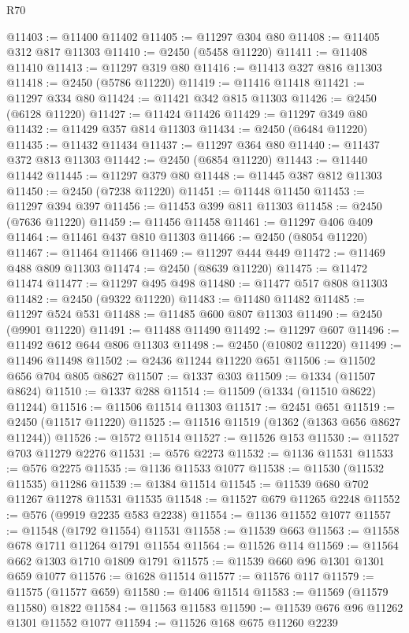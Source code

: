 \begin{lexlean}{R70}
\begin{coremodule}
@11403 := @11400 @11402
@11405 := @11297 @304 @80
@11408 := @11405 @312 @817 @11303
@11410 := @2450 (@5458 @11220)
@11411 := @11408 @11410
@11413 := @11297 @319 @80
@11416 := @11413 @327 @816 @11303
@11418 := @2450 (@5786 @11220)
@11419 := @11416 @11418
@11421 := @11297 @334 @80
@11424 := @11421 @342 @815 @11303
@11426 := @2450 (@6128 @11220)
@11427 := @11424 @11426
@11429 := @11297 @349 @80
@11432 := @11429 @357 @814 @11303
@11434 := @2450 (@6484 @11220)
@11435 := @11432 @11434
@11437 := @11297 @364 @80
@11440 := @11437 @372 @813 @11303
@11442 := @2450 (@6854 @11220)
@11443 := @11440 @11442
@11445 := @11297 @379 @80
@11448 := @11445 @387 @812 @11303
@11450 := @2450 (@7238 @11220)
@11451 := @11448 @11450
@11453 := @11297 @394 @397
@11456 := @11453 @399 @811 @11303
@11458 := @2450 (@7636 @11220)
@11459 := @11456 @11458
@11461 := @11297 @406 @409
@11464 := @11461 @437 @810 @11303
@11466 := @2450 (@8054 @11220)
@11467 := @11464 @11466
@11469 := @11297 @444 @449
@11472 := @11469 @488 @809 @11303
@11474 := @2450 (@8639 @11220)
@11475 := @11472 @11474
@11477 := @11297 @495 @498
@11480 := @11477 @517 @808 @11303
@11482 := @2450 (@9322 @11220)
@11483 := @11480 @11482
@11485 := @11297 @524 @531
@11488 := @11485 @600 @807 @11303
@11490 := @2450 (@9901 @11220)
@11491 := @11488 @11490
@11492 := @11297 @607
@11496 := @11492 @612 @644 @806 @11303
@11498 := @2450 (@10802 @11220)
@11499 := @11496 @11498
@11502 := @2436 @11244 @11220 @651
@11506 := @11502 @656 @704 @805 @8627
@11507 := @1337 @303
@11509 := @1334 (@11507 @8624)
@11510 := @1337 @288
@11514 := @11509 (@1334 (@11510 @8622) @11244)
@11516 := @11506 @11514 @11303
@11517 := @2451 @651
@11519 := @2450 (@11517 @11220)
@11525 := @11516 @11519 (@1362 (@1363 @656 @8627 @11244))
@11526 := @1572 @11514
@11527 := @11526 @153
@11530 := @11527 @703 @11279 @2276
@11531 := @576 @2273
@11532 := @1136 @11531
@11533 := @576 @2275
@11535 := @1136 @11533 @1077
@11538 := @11530 (@11532 @11535) @11286
@11539 := @1384 @11514
@11545 := @11539 @680 @702 @11267 @11278 @11531 @11535
@11548 := @11527 @679 @11265 @2248
@11552 := @576 (@9919 @2235 @583 @2238)
@11554 := @1136 @11552 @1077
@11557 := @11548 (@1792 @11554) @11531
@11558 := @11539 @663
@11563 := @11558 @678 @1711 @11264 @1791 @11554
@11564 := @11526 @114
@11569 := @11564 @662 @1303 @1710 @1809 @1791
@11575 := @11539 @660 @96 @1301 @1301 @659 @1077
@11576 := @1628 @11514
@11577 := @11576 @117
@11579 := @11575 (@11577 @659)
@11580 := @1406 @11514
@11583 := @11569 (@11579 @11580) @1822
@11584 := @11563 @11583
@11590 := @11539 @676 @96 @11262 @1301 @11552 @1077
@11594 := @11526 @168 @675 @11260 @2239

\end{coremodule}
\end{lexlean}
